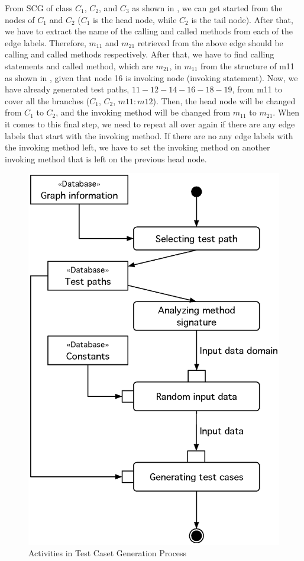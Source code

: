 From SCG of class $C_1$, $C_2$, and $C_3$ as shown in , 
we can get started from the nodes of $C_1$ and $C_2$ ($C_1$ is the head node, 
while $C_2$ is the tail node). After that, we have to extract the name of 
the calling and called methods from each of the edge labels. 
Therefore, $m_{11}$ and $m_{21}$ retrieved from the above edge should be 
calling and called methods respectively. After that, we have to find 
calling statements and called method, which are $m_{21}$, in $m_{11}$ from 
the structure of m11 as shown in , given that node 16 is invoking node 
(invoking statement). Now, we have already generated test paths, $11-12-14-16-18-19$, 
from m11 to cover all the branches ($C_1$, $C_2$, $m11:m12$). Then, the head node 
will be changed from $C_1$ to $C_2$, and the invoking method will be changed 
from $m_{11}$ to $m_{21}$. When it comes to this final step, we need to repeat all 
over again if there are any edge labels that start with the invoking method. 
If there are no any edge labels with the invoking method left, we have to set 
the invoking method on another invoking method that is left on 
the previous head node.

\begin{figure}[ht!]
\centering
\includegraphics[width=0.7\linewidth]{figures/Activities}
\caption{Activities in Test Caset Generation Process}
\label{fig:activitiesTC}
\end{figure}

